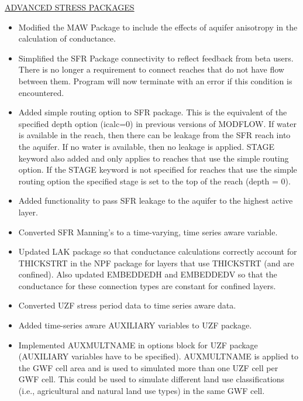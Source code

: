 \documentclass[11pt,twoside,twocolumn]{usgsreport}
\begin{document}
\begin{itemize}
\underline{ADVANCED STRESS PACKAGES}
\begin{itemize}
\item Modified the MAW Package to include the effects of aquifer anisotropy in the calculation of conductance.
\item Simplified the SFR Package connectivity to reflect feedback from beta users. There is no longer a requirement to connect reaches that do not have flow between them.  Program will now terminate with an error if this condition is encountered.
\item Added simple routing option to SFR package. This is the equivalent of the specified depth option (icalc=0) in previous versions of MODFLOW. If water is available in the reach, then there can be leakage from the SFR reach into the aquifer.  If no water is available, then no leakage is applied.  STAGE keyword also added and only applies to reaches that use the simple routing option. If the STAGE keyword is not specified for reaches that use the simple routing option the specified stage is set to the top of the reach (depth = 0).
\item Added functionality to pass SFR leakage to the aquifer to the highest active layer.
\item Converted SFR Manning's to a time-varying, time series aware variable.  
\item Updated LAK package so that conductance calculations correctly account for THICKSTRT in the NPF package for layers that use THICKSTRT (and are confined). Also updated EMBEDDEDH and EMBEDDEDV so that the conductance for these connection types are constant for confined layers.
\item Converted UZF stress period data to time series aware data.
\item Added time-series aware AUXILIARY variables to UZF package.
\item Implemented AUXMULTNAME in options block for UZF package (AUXILIARY variables have to be specified). AUXMULTNAME is applied to the GWF cell area and is used to simulated more than one UZF cell per GWF cell. This could be used to simulate different land use classifications (i.e., agricultural and natural land use types) in the same GWF cell.
\end{itemize}


\end{itemize}
\end{document}
